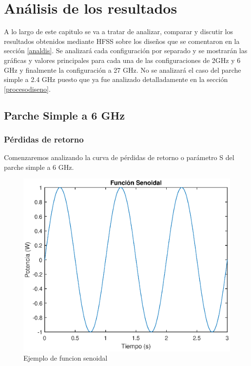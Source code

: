 \chapter{Análisis de los resultados}
\label{resultados}

A lo largo de este capitulo se va a tratar de analizar, comparar y discutir los resultados obtenidos mediante HFSS sobre los diseños que se comentaron en la sección \ref{analdis}. Se analizará cada configuración por separado y se mostrarán las gráficas y valores principales para cada una de las configuraciones de 2GHz y 6 GHz y finalmente la configuración a 27 GHz. No se analizará el caso del parche simple a 2.4 GHz puesto que ya fue analizado detalladamente en la sección \ref{procesodiseno}.

\section{Parche Simple a 6 GHz}
\subsection{Pérdidas de retorno}
\par Comenzaremos analizando la curva de pérdidas de retorno o parámetro S del parche simple a 6 GHz. 

\begin{figure}[h]
    \centering
        \includegraphics[width=15cm]{archivos/seno}
        \caption{Ejemplo de funcion senoidal}
        \label{fig:seno}
\end{figure}




